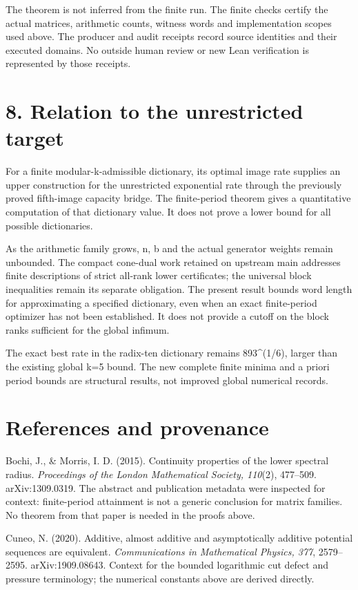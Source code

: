 The theorem is not inferred from the finite run. The finite checks certify the actual matrices, arithmetic counts, witness words and implementation scopes used above. The producer and audit receipts record source identities and their executed domains. No outside human review or new Lean verification is represented by those receipts.

\section{8. Relation to the unrestricted target}\label{n28-relation-to-the-unrestricted-target}

For a finite modular-k-admissible dictionary, its optimal image rate supplies an upper construction for the unrestricted exponential rate through the previously proved fifth-image capacity bridge. The finite-period theorem gives a quantitative computation of that dictionary value. It does not prove a lower bound for all possible dictionaries.

As the arithmetic family grows, n, b and the actual generator weights remain unbounded. The compact cone-dual work retained on upstream main addresses finite descriptions of strict all-rank lower certificates; the universal block inequalities remain its separate obligation. The present result bounds word length for approximating a specified dictionary, even when an exact finite-period optimizer has not been established. It does not provide a cutoff on the block ranks sufficient for the global infimum.

The exact best rate in the radix-ten dictionary remains 893\^{}(1/6), larger than the existing global k=5 bound. The new complete finite minima and a priori period bounds are structural results, not improved global numerical records.

\section{References and provenance}\label{n28-references-and-provenance}

Bochi, J., \& Morris, I. D. (2015). Continuity properties of the lower spectral radius. \emph{Proceedings of the London Mathematical Society, 110}(2), 477--509. arXiv:1309.0319. The abstract and publication metadata were inspected for context: finite-period attainment is not a generic conclusion for matrix families. No theorem from that paper is needed in the proofs above.

Cuneo, N. (2020). Additive, almost additive and asymptotically additive potential sequences are equivalent. \emph{Communications in Mathematical Physics, 377}, 2579--2595. arXiv:1909.08643. Context for the bounded logarithmic cut defect and pressure terminology; the numerical constants above are derived directly.

